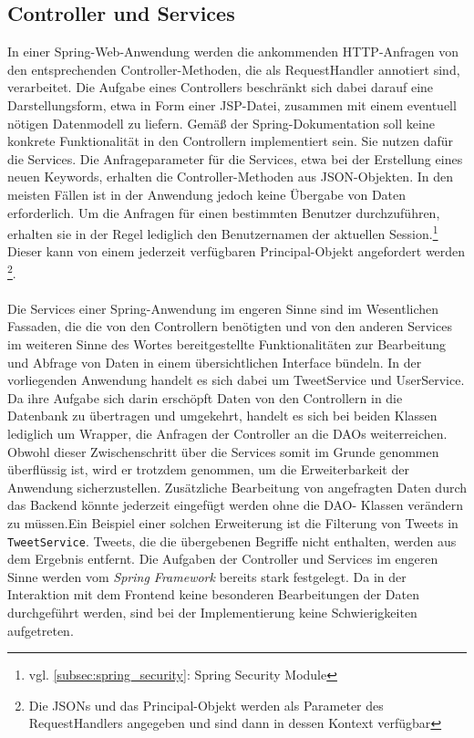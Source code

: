 \subsection{Controller und Services}
In einer Spring-Web-Anwendung werden die ankommenden HTTP-Anfragen von den entsprechenden 
Controller-Methoden, die als RequestHandler annotiert sind, verarbeitet. Die Aufgabe eines 
Controllers beschränkt sich dabei darauf eine Darstellungsform, etwa in Form einer JSP-Datei, 
zusammen mit einem eventuell nötigen Datenmodell zu liefern. Gemäß der Spring-Dokumentation soll 
keine konkrete Funktionalität in den Controllern implementiert sein. Sie nutzen dafür die Services. 
Die Anfrageparameter für die Services, etwa bei der Erstellung eines neuen Keywords, erhalten die 
Controller-Methoden aus JSON-Objekten. In den meisten Fällen ist in der Anwendung jedoch keine 
Übergabe von Daten erforderlich. Um die Anfragen für einen bestimmten Benutzer durchzuführen, 
erhalten sie in der Regel lediglich den Benutzernamen der aktuellen Session.\footnote{vgl. 
\autoref{subsec:spring_security}: Spring Security Module} Dieser kann von einem jederzeit 
verfügbaren Principal-Objekt angefordert werden \footnote{Die JSONs und das Principal-Objekt werden 
als Parameter des RequestHandlers angegeben und sind dann in dessen Kontext verfügbar}.
\\\\
Die Services einer Spring-Anwendung im engeren Sinne sind im Wesentlichen Fassaden, die die von den 
Controllern benötigten und von den anderen Services im weiteren Sinne des Wortes bereitgestellte 
Funktionalitäten zur Bearbeitung und Abfrage von Daten in einem übersichtlichen Interface bündeln. 
In der vorliegenden Anwendung handelt es sich dabei um TweetService und UserService. Da ihre Aufgabe 
sich darin erschöpft Daten von den Controllern in die Datenbank zu übertragen und umgekehrt, handelt 
es sich bei beiden Klassen lediglich um Wrapper, die Anfragen der Controller an die DAOs 
weiterreichen. Obwohl dieser Zwischenschritt über die Services somit im Grunde genommen überflüssig 
ist, wird er trotzdem genommen, um die Erweiterbarkeit der Anwendung sicherzustellen. Zusätzliche 
Bearbeitung von angefragten Daten durch das Backend könnte jederzeit eingefügt werden ohne die DAO-
Klassen verändern zu müssen.Ein Beispiel einer solchen Erweiterung ist die Filterung von Tweets in \texttt{TweetService}. 
Tweets, die die übergebenen Begriffe nicht enthalten, werden aus dem Ergebnis entfernt.
\newpage
Die Aufgaben der Controller und Services im engeren Sinne werden vom \textit{Spring Framework} 
bereits stark festgelegt. Da in der Interaktion mit dem Frontend keine besonderen Bearbeitungen der 
Daten durchgeführt werden, sind bei der Implementierung keine Schwierigkeiten aufgetreten.

